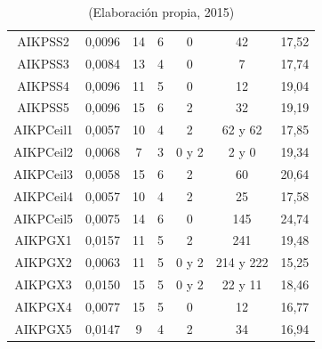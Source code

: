 \begin{table}[hbtp!]
\begin{center}
\begin{tabular}{ccccccc}
AIKPSS2 & 0,0096 & 14 & 6 & 0 & 42 & 17,52 \\
AIKPSS3 & 0,0084 & 13 & 4 & 0 & 7 & 17,74 \\
AIKPSS4 & 0,0096 & 11 & 5 & 0 & 12 & 19,04 \\
AIKPSS5 & 0,0096 & 15 & 6 & 2 & 32 & 19,19 \\ \hline
AIKPCeil1 & 0,0057 & 10 & 4 & 2 & 62 y 62 & 17,85 \\
AIKPCeil2 & 0,0068 & 7 & 3 & 0 y 2 & 2 y 0 & 19,34 \\
AIKPCeil3 & 0,0058 & 15 & 6 & 2 & 60 & 20,64 \\
AIKPCeil4 & 0,0057 & 10 & 4 & 2 & 25 & 17,58 \\
AIKPCeil5 & 0,0075 & 14 & 6 & 0 & 145 & 24,74 \\ \hline
AIKPGX1 & 0,0157 & 11 & 5 & 2 & 241 & 19,48 \\
AIKPGX2 & 0,0063 & 11 & 5 & 0 y 2 & 214 y 222 & 15,25 \\
AIKPGX3 & 0,0150 & 15 & 5 & 0 y 2 & 22 y 11 & 18,46 \\
AIKPGX4 & 0,0077 & 15 & 5 & 0 & 12 & 16,77 \\
AIKPGX5 & 0,0147 & 9 & 4 & 2 & 34 & 16,94 \\
\hline
\end{tabular}
\end{center}
\caption*{(Elaboración propia, 2015)}
\end{table}

